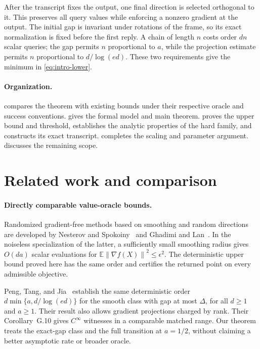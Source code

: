 \documentclass[11pt]{article}
\numberwithin{equation}{section}
\theoremstyle{definition}
\theoremstyle{remark}
\newcommand{\norm}[1]{\left\lVert #1\right\rVert}
\newcommand{\E}{\mathbb{E}}
\begin{document}
After the transcript fixes the output, one final direction is selected
orthogonal to it. This preserves all query values while enforcing a
nonzero gradient at the output. The initial gap is invariant under
rotations of the frame, so its exact normalization is fixed before the
first reply. A chain of length $n$ costs order $dn$ scalar queries; the
gap permits $n$ proportional to $a$, while the projection estimate permits
$n$ proportional to $d/\log(ed)$. These two requirements give the
minimum in \eqref{eq:intro-lower}.

\paragraph{Organization.}
 compares the theorem with existing bounds under their
respective oracle and success conventions.  gives the
formal model and main theorem.  proves the upper bound
and threshold,  establishes the analytic properties of the
hard family, and  constructs its exact transcript.
 completes the scaling and parameter argument.
 discusses the remaining scope.

\section{Related work and comparison}
\label{sec:related}

\paragraph{Directly comparable value-oracle bounds.}
Randomized gradient-free methods based on smoothing and random directions
are developed by Nesterov and Spokoiny~\cite{NS2017} and Ghadimi and
Lan~\cite{GL2013}. In the noiseless specialization of the latter, a
sufficiently small smoothing radius gives $O(da)$ scalar evaluations for
$\E\norm{\nabla f(X)}^2\leq\epsilon^2$. The deterministic upper bound
proved here has the same order and certifies the returned point on every
admissible objective.

Peng, Tang, and Jia~\cite[Theorem~E.8]{PTJ2026} establish the same
deterministic order $d\min\{a,d/\log(ed)\}$ for the smooth class with
gap at most $\Delta$, for all $d\geq1$ and $a\geq1$. Their result also
allows gradient projections charged by rank. Their
Corollary~G.10 gives $C^\infty$ witnesses in a comparable matched range.
Our theorem treats the exact-gap class and the full transition at
$a=1/2$, without claiming a better asymptotic rate or broader oracle.
\end{document}
